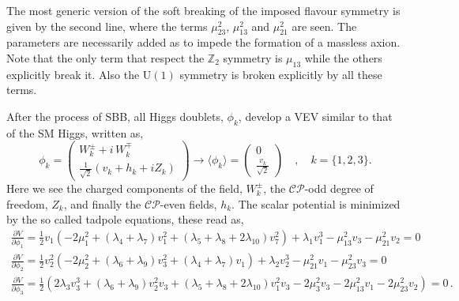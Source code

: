 \documentclass[10pt]{report}
\begin{document}
%
The most generic version of the soft breaking of the imposed flavour symmetry is given by the second line, where the terms $\mu_{23}^2$, $\mu_{13}^2$ and $\mu_{21}^2$ are seen. 
%
The parameters are necessarily added as to impede the formation of a massless axion. Note that the only term that respect the $\mathbb{Z}_2$ symmetry is $\mu_{13}$ while the others explicitly break it. Also the $\mathrm{U(1)}$ symmetry is broken explicitly by all these terms. 

After the process of SBB, all Higgs doublets, $\phi_k$, develop a VEV  similar to that of the SM Higgs, written as, 
%
\begin{equation}
\phi_k = 
\begin{pmatrix}
W_k^\pm + i \, W_k^\mp \\ 
\frac{1}{\sqrt{2}}\left( v_k + h_k + i Z_k \right)
\end{pmatrix}  \rightarrow \langle \phi_k \rangle = \begin{pmatrix}
0 \\ 
\frac{v_k}{\sqrt{2}}
\end{pmatrix} \quad , \quad k=\{ 1,2,3\} .  
\label{eq:3HDM_Higgs_Field_VEV} 
\end{equation} 
%
Here we see the charged components of the field, $W_k^\pm$, the $\mathcal{CP}$-odd degree of freedom, $Z_k$, and finally the $\mathcal{CP}$-even fields, $h_k$. The scalar potential is minimized by the so called tadpole equations, these read as, 
%
\begin{equation}
\label{eq:3HDM_tadpoles}
\begin{gathered}
\frac{\partial V}{\partial \phi_1} =  \frac{1}{2} v_1 \left(-2 \mu _1^2+\left(\lambda _4+\lambda _7\right) v_1^2+\left(\lambda _5+\lambda _8+2 \lambda _{10}\right) v_7^2\right)+\lambda _1 v_1^3-\mu _{13}^2 v_3-\mu _{21}^2 v_2 = 0 \\ 
\frac{\partial V}{\partial \phi_2} =  \frac{1}{2} v_2^2 \left(-2 \mu _2^2+\left(\lambda _6+\lambda _9\right) v_3^2+\left(\lambda _4+\lambda _7\right) v_1\right)+\lambda _2 v_2^3-\mu _{21}^2 v_1-\mu _{23}^2 v_3  = 0 \\
\frac{\partial V}{\partial \phi_3} =  \frac{1}{2} \left(2 \lambda _3 v_3^3+\left(\lambda _6+\lambda _9\right) v_2^2 v_3+\left(\lambda _5+\lambda _8+2 \lambda _{10}\right) v_1^2 v_3-2 \mu _3^2 v_3-2 \mu _{13}^2 v_1-2 \mu _{23}^2 v_2\right)  = 0 \, . \\
\end{gathered} 
\end{equation}
\end{document}

